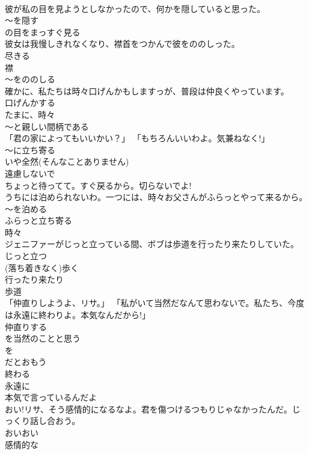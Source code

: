 \documentclass[8pt]{extreport}
\begin{document}
\begin{CJK}{UTF8}{min}
\\	彼が私の目を見ようとしなかったので、何かを隠していると思った。	
\\	～を隠す 
\\	の目をまっすぐ見る
\\	彼女は我慢しきれなくなり、襟首をつかんで彼をののしった。	
\\	尽きる 
\\	襟 
\\	～をののしる
\\	確かに、私たちは時々口げんかもしますっが、普段は仲良くやっています。	
\\	口げんかする 
\\	たまに、時々 
\\	～と親しい間柄である
\\	「君の家によってもいいかい？」 「もちろんいいわよ。気兼ねなく!」	
\\	～に立ち寄る 
\\	いや全然(そんなことありません) 
\\	遠慮しないで
\\	ちょっと待ってて。すぐ戻るから。切らないでよ!	
\\	うちには泊められないわ。一つには、時々お父さんがふらっとやって来るから。	
\\	～を泊める 
\\	ふらっと立ち寄る 
\\	時々
\\	ジェニファーがじっと立っている間、ボブは歩道を行ったり来たりしていた。	
\\	じっと立つ 
\\	(落ち着きなく)歩く 
\\	行ったり来たり 
\\	歩道
\\	「仲直りしようよ、リサ。」 「私がいて当然だなんて思わないで。私たち、今度は永遠に終わりよ。本気なんだから!」	
\\	仲直りする 
\\	を当然のことと思う 
\\	を
\\	だとおもう 
\\	終わる 
\\	永遠に 
\\	本気で言っているんだよ
\\	おい!リサ、そう感情的になるなよ。君を傷つけるつもりじゃなかったんだ。じっくり話し合おう。	
\\	おいおい 
\\	感情的な 

\end{CJK}
\end{document}
